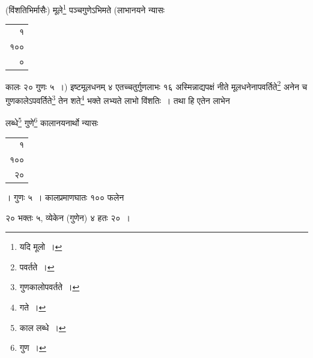 \documentclass[10pt, openany]{book}
\begin{document}
{{{{{(विंशतिभिर्मासैः) मूले\renewcommand{\thefootnote}{\s १२}\footnote{\s यदि मूलो~।}  पञ्चगुणेऽभिमते (लाभानयने न्यासः\textendash \,\begin{tabular}{r|} १  \\१००  \\०\end{tabular} कालः २० गुणः ५~।) इष्टमूलधनम् ४ एतच्चतुर्गुणलाभः १६ अस्मिन्नाद्यपक्षं नीते
मूलधनेनापवर्तिते\renewcommand{\thefootnote}{\s १३}\footnote{\s *पवर्तते~।} अनेन च गुणकालेऽपवर्तिते\renewcommand{\thefootnote}{\s १४}\footnote{\s गुणकालोपवर्तते~।}  तेन शते\renewcommand{\thefootnote}{\s १५}\footnote{\s गते~।}  भक्ते लभ्यते लाभो विंशतिः~।
तथा हि एतेन लाभेन}


\newpage

\vspace{-1mm}

{लब्धे\renewcommand{\thefootnote}{\s २}\footnote{\s काल लब्धे~।} गुणे\renewcommand{\thefootnote}{\s ३}\footnote{\s गुण~।} कालानयनार्थो न्यासः\textendash \begin{tabular}{r}१\\१००\\२०\end{tabular}। गुणः ५~। कालप्रमाणघातः
१०० फलेन}
{२० भक्तः ५, व्येकेन (गुणेन) ४ हतः २०~।}
\vspace{2mm}

}}}}
\end{document}
